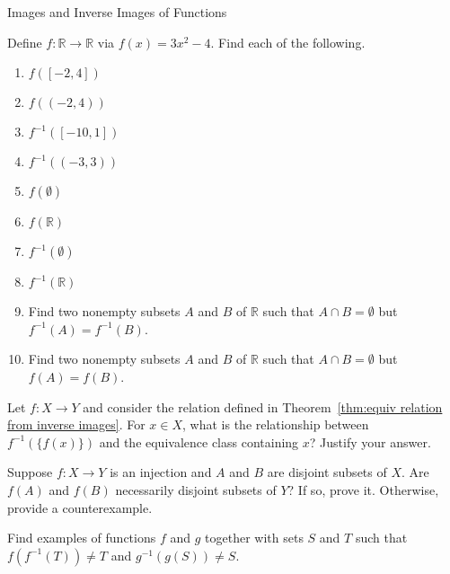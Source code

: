 \begin{section}{Images and Inverse Images of Functions}
\begin{problem}
Define $f:\mathbb{R}\to\mathbb{R}$ via $f(x)=3x^2-4$.
Find each of the following.
\begin{enumerate}[label=\textrm{(\alph*)}]
\item $f([-2,4])$
\item $f((-2,4))$
\item $f^{-1}([-10,1])$
\item $f^{-1}((-3,3))$
\item $f(\emptyset)$
\item $f(\mathbb{R})$
\item $f^{-1}(\emptyset)$
\item $f^{-1}(\mathbb{R})$
\item Find two nonempty subsets $A$ and $B$ of $\mathbb{R}$ such that $A\cap B=\emptyset$ but $f^{-1}(A)=f^{-1}(B)$.
\item Find two nonempty subsets $A$ and $B$ of $\mathbb{R}$ such that $A\cap B=\emptyset$ but $f(A)=f(B)$.
\end{enumerate}
\end{problem}

\begin{problem}
Let $f:X\to Y$ and consider the relation defined in Theorem~\ref{thm:equiv relation from inverse images}. For $x\in X$, what is the relationship between $f^{-1}(\{f(x)\})$ and the equivalence class containing $x$?  Justify your answer.
\end{problem}

\begin{problem}
Suppose $f:X\to Y$ is an injection and $A$ and $B$ are disjoint subsets of $X$. Are $f(A)$ and $f(B)$ necessarily disjoint subsets of $Y$?  If so, prove it. Otherwise, provide a counterexample.
\end{problem}

\begin{problem}
Find examples of functions $f$ and $g$ together with sets $S$ and $T$ such that $f(f^{-1}(T))\neq T$ and $g^{-1}(g(S))\neq S$.
\end{problem}


\end{section}
